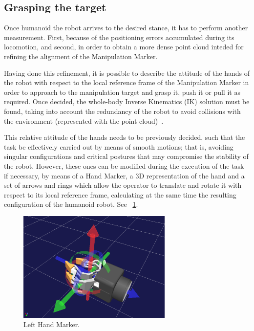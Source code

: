 	\subsection{Grasping the target}
		
		Once humanoid the robot arrives to the desired stance, it has to perform another measurement.
		First, because of the positioning errors accumulated during its locomotion, and second,
		in order to obtain a more dense point cloud inteded for refining the alignment of the Manipulation Marker.
		
		Having done this refinement, it is possible to describe the attitude of the hands of the robot with respect
		to the local reference frame of the Manipulation Marker in order to approach to the manipulation target and
		grasp it, push it or pull it as required.
		Once decided, the whole-body Inverse Kinematics (IK) solution must be found, taking into account the redundancy
		of the robot to avoid collisions with the environment (represented with the point cloud)~\cite{Kanoun}.
		
		This relative attitude of the hands needs to be previously decided, such that the task be effectively carried
		out by means of smooth motions; that is, avoiding singular configurations and critical postures that may
		compromise the stability of the robot.
		However, these ones can be modified during the execution of the task if necessary, by means of a Hand Marker,
		a 3D representation of the hand and a set of arrows and rings which allow the operator to translate and rotate it
		with respect to its local reference frame, calculating at the same time the resulting configuration of the
		humanoid robot.
		See \figurename~\ref{fig:HandMarker}.
		
		\begin{figure}[b]
			\centering
			\includegraphics[height = 5.5cm]{img/HandMarker}
			\caption{Left Hand Marker.}
			\label{fig:HandMarker}
		\end{figure}
		

